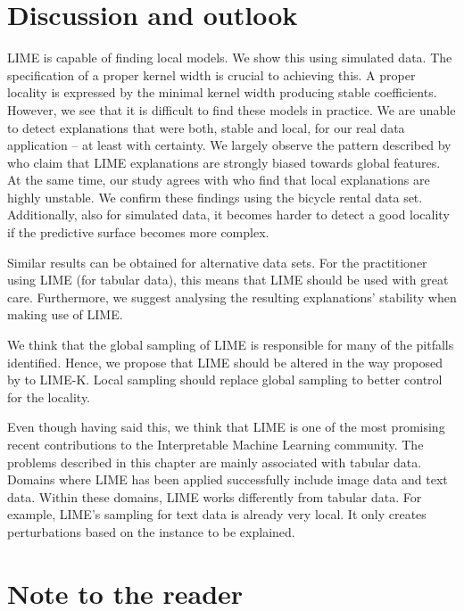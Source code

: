 \documentclass[
]{krantz}
\begin{document}
\hypertarget{id5}{%
\section{Discussion and outlook}\label{id5}}

LIME is capable of finding local models.
We show this using simulated data.
The specification of a proper kernel width is crucial to achieving this.
A proper locality is expressed by the minimal kernel width producing stable coefficients.
However, we see that it is difficult to find these models in practice.
We are unable to detect explanations that were both, stable and local, for our real data application -- at least with certainty.
We largely observe the pattern described by \citet{laugel2018defining} who claim that LIME explanations are strongly biased towards global features.
At the same time, our study agrees with \citet{alvarez2018robustness} who find that local explanations are highly unstable.
We confirm these findings using the bicycle rental data set.
Additionally, also for simulated data, it becomes harder to detect a good locality if the predictive surface becomes more complex.

Similar results can be obtained for alternative data sets.
For the practitioner using LIME (for tabular data), this means that LIME should be used with great care.
Furthermore, we suggest analysing the resulting explanations' stability when making use of LIME.

We think that the global sampling of LIME is responsible for many of the pitfalls identified.
Hence, we propose that LIME should be altered in the way proposed by \citet{laugel2018defining} to LIME-K.
Local sampling should replace global sampling to better control for the locality.

Even though having said this, we think that LIME is one of the most promising recent contributions to the Interpretable Machine Learning community.
The problems described in this chapter are mainly associated with tabular data.
Domains where LIME has been applied successfully include image data and text data.
Within these domains, LIME works differently from tabular data.
For example, LIME's sampling for text data is already very local.
It only creates perturbations based on the instance to be explained.

\hypertarget{id6}{%
\section{Note to the reader}\label{id6}}
\end{document}
